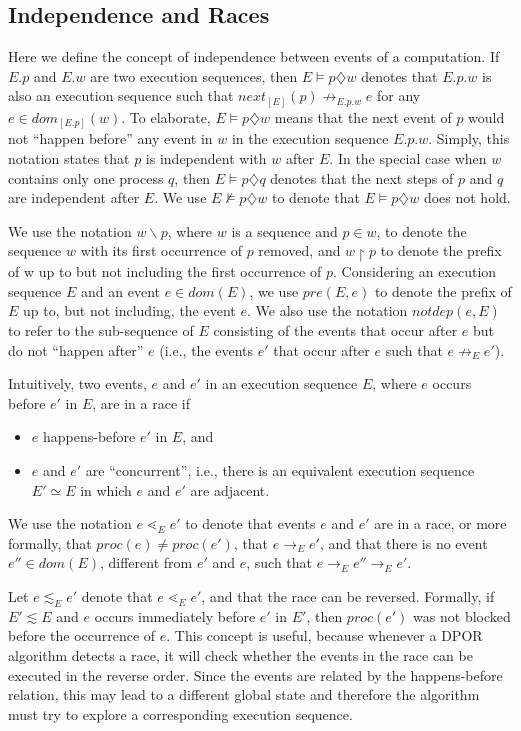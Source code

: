 \subsection{Independence and Races}

Here we define the concept of independence between events of a computation. If
$E.p$ and $E.w$ are two execution sequences, then $E \models p\diamondsuit w$ denotes
that $E.p.w$ is also an execution sequence such that $next_{[E]}(p) \not \rightarrow_{E.p.w} e$
for any $e \in dom_{[E.p]}(w)$. To elaborate, $E \models p \diamondsuit w$ means that
the next event of $p$ would not “happen before” any event in $w$
in the execution sequence $E.p.w$. Simply, this notation states that $p$ is
independent with $w$ after $E$. In the special case when $w$ contains
only one process $q$, then $E \models p \diamondsuit q$ denotes that the next steps of
$p$ and $q$ are independent after $E$. We use $E \not \models p \diamondsuit w$ to denote that
$E\models p \diamondsuit w$ does not hold.


We use the notation $w \backslash p$, where $w$ is a sequence and $p \in w$, to denote the sequence
$w$ with its first occurrence of $p$ removed, and $w \upharpoonright p$ to denote the
prefix of w up to but not including the first occurrence of $p$. 
Considering an execution sequence $E$ and an event $e \in  dom(E)$, we use $pre(E,e)$
to denote the prefix of $E$ up to, but not including, the event $e$. We also use 
the notation $notdep(e, E)$ to refer to the 
sub-sequence of $E$ consisting of the events that occur after $e$ but do
not “happen after” $e$ (i.e., the events $e'$ that occur after $e$ such that
$e \not \rightarrow_E e'$).

Intuitively, two events, $e$ and $e'$ in an execution sequence $E$, where
$e$ occurs before $e'$ in $E$, are in a race if
\begin{itemize}
\item $e$ happens-before $e'$ in $E$, and
\item $e$ and $e'$ are “concurrent”, i.e., there is an equivalent execution
sequence $E' \simeq E$ in which $e$ and $e'$ are adjacent.
\end{itemize}
We use the notation $e \lessdot_E e'$ to denote that events $e$ and $e'$ are in a race, 
or more formally, that $proc(e) \not = proc(e')$, that $e \rightarrow_E e'$,
and that there is no event $e'' \in dom(E)$, different from $e'$ and $e$,
such that $e \rightarrow_E e'' \rightarrow_E e'$.

Let $e \lesssim_E e'$ denote
that $e \lessdot_E e'$, and that the race can be reversed. Formally, if $E' \lesssim E$
and $e$ occurs immediately before $e'$ in $E'$, then $proc(e')$ was not
blocked before the occurrence of $e$. This concept is useful, because 
whenever a DPOR algorithm detects a race, it will check
whether the events in the race can be executed in the reverse order.
Since the events are related by the happens-before relation, this may
lead to a different global state and therefore the algorithm must try to
explore a corresponding execution sequence.

